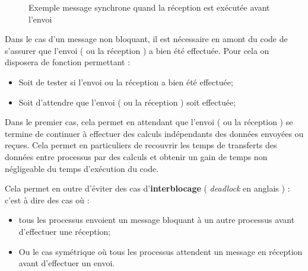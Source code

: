 \documentclass[fleqn,11pt]{article}
\begin{document}
  \begin{figure}
    \centering
  \caption{Exemple message synchrone quand la réception est exécutée avant l'envoi}
  \end{figure}

Dans le cas d'un message non bloquant, il est nécessaire en amont du code
de s'assurer que l'envoi ( ou la réception ) a bien été effectuée. Pour cela
on disposera de fonction permettant :

\begin{itemize}
\item Soit de tester si l'envoi ou la réception a bien été effectuée;
\item Soit d'attendre que l'envoi ( ou la réception ) soit effectuée;
\end{itemize}

Dans le premier cas, cela permet en attendant que l'envoi ( ou
la réception ) se termine de continuer à effectuer des calculs
indépendants des données envoyées ou reçues. Cela permet en particuliers
de recouvrir les temps de transferts des données entre processus par
des calculs et obtenir un gain de temps non négligeable du temps d'exécution
du code.

Cela permet en outre d'éviter des cas d'\textbf{interblocage} ( \textsl{deadlock} en
anglais ) : c'est à dire des cas
où :
\begin{itemize}
\item tous les processus envoient un message bloquant à un autre processus
avant d'effectuer une réception;
\item Ou le cas symétrique où tous les processus attendent un message en réception
avant d'effectuer un envoi.
\end{itemize}
\pagebreak
\end{document}
